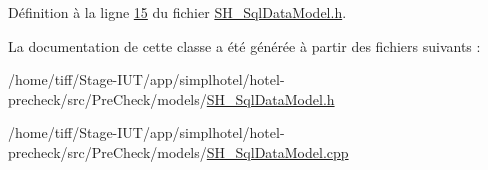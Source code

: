 Définition à la ligne \hyperlink{SH__SqlDataModel_8h_source_l00015}{15} du fichier \hyperlink{SH__SqlDataModel_8h_source}{S\-H\-\_\-\-Sql\-Data\-Model.\-h}.



La documentation de cette classe a été générée à partir des fichiers suivants \-:\begin{DoxyCompactItemize}
\item 
/home/tiff/\-Stage-\/\-I\-U\-T/app/simplhotel/hotel-\/precheck/src/\-Pre\-Check/models/\hyperlink{SH__SqlDataModel_8h}{S\-H\-\_\-\-Sql\-Data\-Model.\-h}\item 
/home/tiff/\-Stage-\/\-I\-U\-T/app/simplhotel/hotel-\/precheck/src/\-Pre\-Check/models/\hyperlink{SH__SqlDataModel_8cpp}{S\-H\-\_\-\-Sql\-Data\-Model.\-cpp}\end{DoxyCompactItemize}
